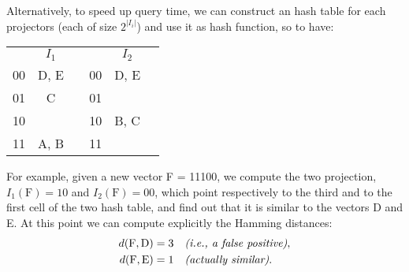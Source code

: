 Alternatively, to speed up query time, we can construct an hash table for each
projectors (each of size $2^{|I_i|}$) and use it as hash function, so to have:
%
\begin{table}[h]
  \centering
  \begin{tabular}{c|c|cc|c|c}
    \multicolumn{1}{c}{} &
    \multicolumn{1}{c}{$I_1$} &
    \multicolumn{1}{c}{} &
    \multicolumn{1}{c}{} &
    \multicolumn{1}{c}{$I_2$} & \\ \cline{2-2} \cline{5-5}
    00 & D, E & & 00 & D, E & \\ \cline{2-2} \cline{5-5}
    01 & C & & 01 & & \\ \cline{2-2} \cline{5-5}
    10 & & & 10 & B, C & \\ \cline{2-2} \cline{5-5}
    11 & A, B & & 11 & & \\ \cline{2-2} \cline{5-5}
  \end{tabular}
\end{table}

For example, given a new vector F = 11100, we compute the two projection,
$I_1(\text{F}) = 10$ and $I_2(\text{F}) = 00$, which point respectively to the
third and to the first cell of the two hash table, and find out that it is
similar to the vectors D and E. At this point we can compute explicitly the
Hamming distances:
%
\begin{align*}
  d(\text{F}, \text{D}) &= 3 \quad \text{\em (i.e., a false positive)},\\
  d(\text{F}, \text{E}) &= 1 \quad \text{\em (actually similar)}.
\end{align*}
